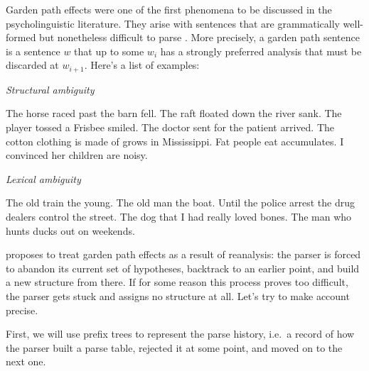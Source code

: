 Garden path effects were one of the first phenomena to be discussed in the psycholinguistic literature.
They arise with sentences that are grammatically well-formed but nonetheless difficult to parse \citep{Frazier79, FrazierRayner82}.
More precisely, a garden path sentence is a sentence $w$ that up to some $w_i$ has a strongly preferred analysis that must be discarded at $w_{i+1}$. 
Here's a list of examples: 
%
\begin{exe}
    \ex \emph{Structural ambiguity}
    \begin{xlist}
        \ex The horse raced past the barn fell.
        \ex The raft floated down the river sank.
        \ex The player tossed a Frisbee smiled.
        \ex The doctor sent for the patient arrived.
        \ex The cotton clothing is made of grows in Mississippi.
        \ex Fat people eat accumulates.
        \ex I convinced her children are noisy.
    \end{xlist}
    \ex \emph{Lexical ambiguity}
    \begin{xlist}
        \ex The old train the young.
        \ex The old man the boat.
        \ex Until the police arrest the drug dealers control the street.
        \ex The dog that I had really loved bones.
        \ex The man who hunts ducks out on weekends.
    \end{xlist}
\end{exe}

\citet{Frazier79} proposes to treat garden path effects as a result of reanalysis: the parser is forced to abandon its current set of hypotheses, backtrack to an earlier point, and build a new structure from there.
If for some reason this process proves too difficult, the parser gets stuck and assigns no structure at all.
Let's try to make  account precise.

First, we will use prefix trees to represent the parse history, i.e.\ a record of how the parser built a parse table, rejected it at some point, and moved on to the next one.


